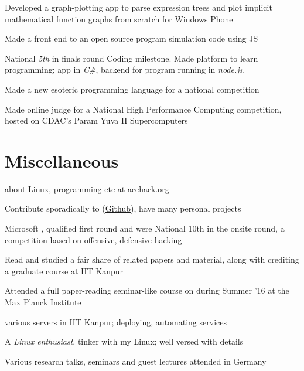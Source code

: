 \documentclass[a4paper]{deedy-resume} %
\newcommand{\onepage}[1]{
  \ifdefined\onep
  #1
  \fi
}
\begin{document}
\begin{minipage}[t]{0.66\textwidth}
  \runsubsection{}
  \begin{tightitemize}
  \item Developed a graph-plotting app to parse expression trees and
    plot implicit mathematical function graphs from scratch for Windows
    Phone
  \item Made a front end to an open source program simulation code
    using JS
  \item National \textit{5th} in finals round Coding milestone.
    Made platform to learn programming; app in
    \textit{C\#}, backend for program running in \textit{node.js}.
  \end{tightitemize}

  \sectionspace

  \runsubsection{}
  \begin{tightitemize}
  \item Made a new esoteric programming language for a national
    competition
  \item Made online judge for a National High Performance Computing competition, hosted on CDAC’s Param Yuva II Supercomputers
  \end{tightitemize}

  \section{Miscellaneous}
  \vspace{\topsep}
  \begin{tightitemize}
  \item {} about Linux, programming etc at
    \href{http://acehack.org}{acehack.org}
  \item Contribute sporadically to 
    (\href{https://github.com/sakshamsharma}{Github}), have many
    personal projects
  \item Microsoft , qualified first round and were
    National 10th in the onsite round, a competition based on
    offensive, defensive hacking
  \item Read and studied a fair share of  related
    papers and material, along with crediting a graduate course at IIT Kanpur
  \item	Attended a full paper-reading seminar-like course on
     during Summer ’16 at the Max Planck
    Institute
  \item {} \onepage{various} servers in IIT Kanpur; deploying,
    automating services
  \item A \textit{Linux enthusiast}, tinker with my Linux; well versed
    with details
  \item Various research talks, seminars and guest lectures attended
    in Germany
  \end{tightitemize}

\end{minipage}
\end{document}
